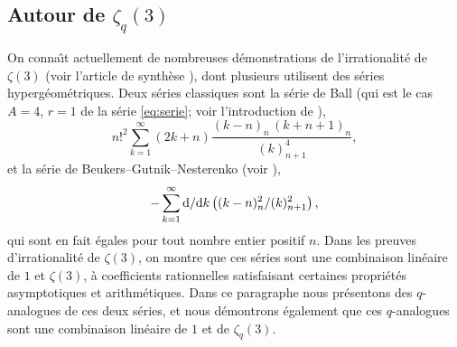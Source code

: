 \documentclass[12pt]{amsart}
\newcommand{\io}{\infty}
\newcommand{\dd}{\textup{d}}
\theoremstyle{remark}
\numberwithin{equation}{section}
\begin{document}
\subsection{Autour de $\zeta_q(3)$} \label{sec:zetaq3}
On conna{\^\i}t actuellement de nombreuses d{\'e}monstrations de l'irrationalit{\'e}
de $\zeta(3)$ (voir l'article de synth{\`e}se \cite{fi}), dont plusieurs 
utilisent des s{\'e}ries hyperg{\'e}om{\'e}triques. 
Deux s{\'e}ries classiques sont la s{\'e}rie de Ball 
(qui est le cas $A=4$, $r=1$ 
de la s{\'e}rie \eqref{eq:serie}; voir l'introduction
de \cite{ri}),
\begin{equation} \label{eq:Ball} 
n!^2\sum_{k=1}^{\io}(2k+n)\frac{(k-n)_n\,(k+n+1)_n}{(k)_{n+1}^4},
\end{equation}
et la s{\'e}rie de Beukers--Gutnik--Nesterenko (voir 
\cite{beuk,gu,ne2}),
\begin{equation} \label{eq:bgn} 
-\sum_{k=1}^{\io}\frac{\dd }{\dd k}\left(\frac{(k-n)_n^2}{(k)_{n+1}^2}\right),
\end{equation}
qui sont en fait {\'e}gales pour tout nombre entier positif $n$.
Dans les preuves d'irrationalit{\'e} de $\zeta(3)$, on montre que ces
s{\'e}ries sont une combinaison lin{\'e}aire de $1$ et $\zeta(3)$, {\`a} 
coefficients rationnelles satisfaisant certaines propri{\'e}t{\'e}s asymptotiques et arithm{\'e}tiques. 
Dans ce paragraphe nous pr{\'e}sentons des $q$-analogues de ces deux 
s{\'e}ries, et nous d{\'e}montrons {\'e}galement que ces $q$-analogues sont 
une combinaison lin{\'e}aire de $1$ et de $\zeta_q(3)$. 
\end{document}
